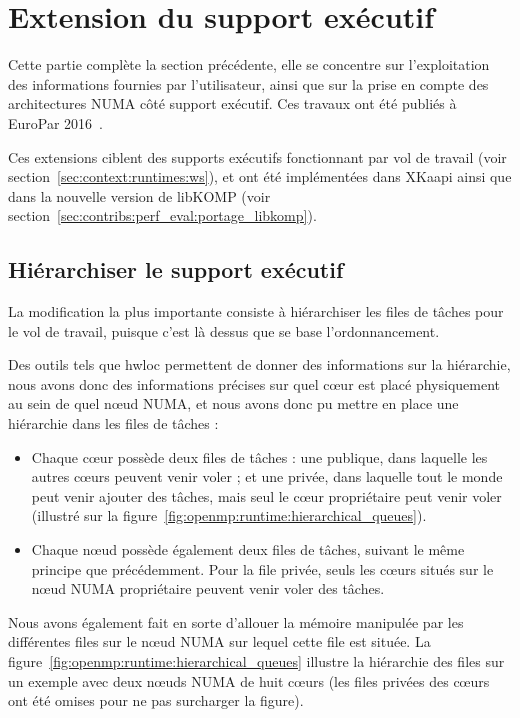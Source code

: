 \section{Extension du support exécutif}\label{sec:openmp:runtime}

Cette partie complète la section précédente, elle se concentre sur l'exploitation des informations fournies par l'utilisateur, ainsi que sur la prise en compte des architectures NUMA côté support exécutif.
Ces travaux ont été publiés à EuroPar 2016~\cite{Virouleau2016b}.

Ces extensions ciblent des supports exécutifs fonctionnant par vol de travail (voir section~\ref{sec:context:runtimes:ws}), et ont été implémentées dans XKaapi ainsi que dans la nouvelle version de libKOMP (voir section~\ref{sec:contribs:perf_eval:portage_libkomp}).

\subsection{Hiérarchiser le support exécutif}

La modification la plus importante consiste à hiérarchiser les files de tâches pour le vol de travail, puisque c'est là dessus que se base l'ordonnancement.

Des outils tels que hwloc permettent de donner des informations sur la hiérarchie, nous avons donc des informations précises sur quel cœur est placé physiquement au sein de quel nœud NUMA, et nous avons donc pu mettre en place une hiérarchie dans les files de tâches :

\begin{itemize}
  \item Chaque cœur possède deux files de tâches : une publique, dans laquelle les autres cœurs peuvent venir voler ; et une privée, dans laquelle tout le monde peut venir ajouter des tâches, mais seul le cœur propriétaire peut venir voler (illustré sur la figure~\ref{fig:openmp:runtime:hierarchical_queues}).
  \item Chaque nœud possède également deux files de tâches, suivant le même principe que précédemment. Pour la file privée, seuls les cœurs situés sur le nœud NUMA propriétaire peuvent venir voler des tâches.
\end{itemize}

Nous avons également fait en sorte d'allouer la mémoire manipulée par les différentes files sur le nœud NUMA sur lequel cette file est située.
La figure~\ref{fig:openmp:runtime:hierarchical_queues} illustre la hiérarchie des files sur un exemple avec deux nœuds NUMA de huit cœurs (les files privées des cœurs ont été omises pour ne pas surcharger la figure).

